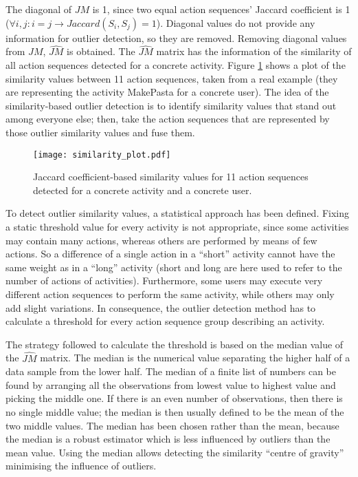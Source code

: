 The diagonal of $JM$ is 1, since two equal action sequences' Jaccard coefficient is 1 ($\forall i, j : i = j \rightarrow Jaccard(S_i, S_j) = 1$). Diagonal values do not provide any information for outlier detection, so they are removed. Removing diagonal values from $JM$, $\hat{JM}$ is obtained. The $\hat{JM}$ matrix has the information of the similarity of all action sequences detected for a concrete activity. Figure \ref{fig-similarity} shows a plot of the similarity values between 11 action sequences, taken from a real example (they are representing the activity MakePasta for a concrete user). The idea of the similarity-based outlier detection is to identify similarity values that stand out among everyone else; then, take the action sequences that are represented by those outlier similarity values and fuse them.  

\begin{figure}[htbp]
\centering
\texttt{[image: similarity\_plot.pdf]}
    \caption{Jaccard coefficient-based similarity values for 11 action sequences detected for a concrete activity and a concrete user.}
    \label{fig-similarity}
\end{figure}

To detect outlier similarity values, a statistical approach has been defined. Fixing a static threshold value for every activity is not appropriate, since some activities may contain many actions, whereas others are performed by means of few actions. So a difference of a single action in a ``short'' activity cannot have the same weight as in a ``long'' activity (short and long are here used to refer to the number of actions of activities). Furthermore, some users may execute very different action sequences to perform the same activity, while others may only add slight variations. In consequence, the outlier detection method has to calculate a threshold for every action sequence group describing an activity. 

The strategy followed to calculate the threshold is based on the median value of the $\hat{JM}$ matrix. The median is the numerical value separating the higher half of a data sample from the lower half. The median of a finite list of numbers can be found by arranging all the observations from lowest value to highest value and picking the middle one. If there is an even number of observations, then there is no single middle value; the median is then usually defined to be the mean of the two middle values. The median has been chosen rather than the mean, because the median is a robust estimator which is less influenced by outliers than the mean value. Using the median allows detecting the similarity ``centre of gravity'' minimising the influence of outliers. %

